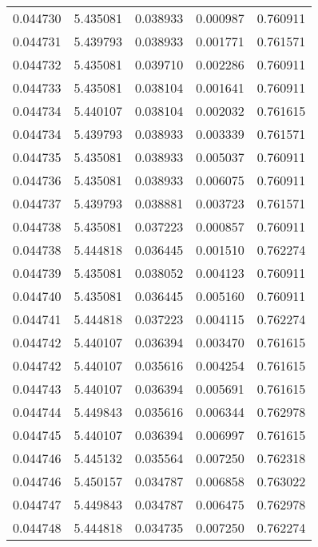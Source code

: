 \begin{tabular}{lrrrr}
0.044730    &  5.435081 &  0.038933 &  0.000987 &             0.760911 \\
0.044731    &  5.439793 &  0.038933 &  0.001771 &             0.761571 \\
0.044732    &  5.435081 &  0.039710 &  0.002286 &             0.760911 \\
0.044733    &  5.435081 &  0.038104 &  0.001641 &             0.760911 \\
0.044734    &  5.440107 &  0.038104 &  0.002032 &             0.761615 \\
0.044734    &  5.439793 &  0.038933 &  0.003339 &             0.761571 \\
0.044735    &  5.435081 &  0.038933 &  0.005037 &             0.760911 \\
0.044736    &  5.435081 &  0.038933 &  0.006075 &             0.760911 \\
0.044737    &  5.439793 &  0.038881 &  0.003723 &             0.761571 \\
0.044738    &  5.435081 &  0.037223 &  0.000857 &             0.760911 \\
0.044738    &  5.444818 &  0.036445 &  0.001510 &             0.762274 \\
0.044739    &  5.435081 &  0.038052 &  0.004123 &             0.760911 \\
0.044740    &  5.435081 &  0.036445 &  0.005160 &             0.760911 \\
0.044741    &  5.444818 &  0.037223 &  0.004115 &             0.762274 \\
0.044742    &  5.440107 &  0.036394 &  0.003470 &             0.761615 \\
0.044742    &  5.440107 &  0.035616 &  0.004254 &             0.761615 \\
0.044743    &  5.440107 &  0.036394 &  0.005691 &             0.761615 \\
0.044744    &  5.449843 &  0.035616 &  0.006344 &             0.762978 \\
0.044745    &  5.440107 &  0.036394 &  0.006997 &             0.761615 \\
0.044746    &  5.445132 &  0.035564 &  0.007250 &             0.762318 \\
0.044746    &  5.450157 &  0.034787 &  0.006858 &             0.763022 \\
0.044747    &  5.449843 &  0.034787 &  0.006475 &             0.762978 \\
0.044748    &  5.444818 &  0.034735 &  0.007250 &             0.762274 \\

\end{tabular}
